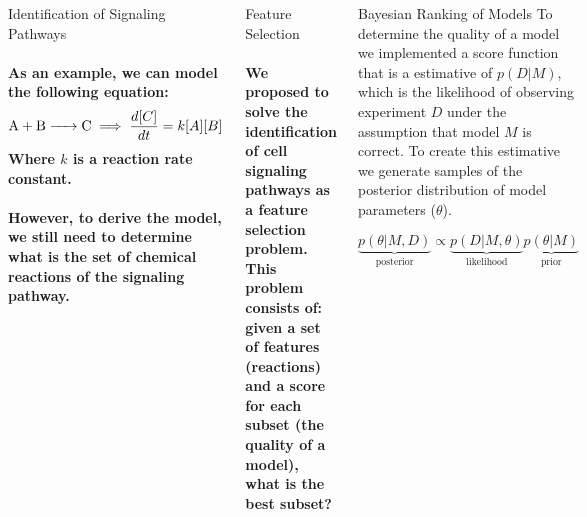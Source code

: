 \begin{frame}
\begin{columns}
{\begin{block}{Identification of Signaling Pathways}
{        
}
\paragraph{
    As an example, we can model the following equation:
    \begin{equation*}
        \ce{A + B -> C} \implies \frac{d[C]}{dt} = k[A][B]
    \end{equation*}
    Where $k$ is a reaction rate constant.
}
\paragraph{
    However, to derive the model, we still need to determine what is
    the set of chemical reactions of the signaling pathway.
}
\end{block}

\begin{block}{Feature Selection}
\paragraph{
    We proposed to solve the identification of cell signaling pathways
    as a feature selection problem. This problem consists of: given 
    a set of features (reactions) and a score for each subset (the
    \alert{quality of a model}), what is the best subset?
}
\end{block}


\begin{block}{Bayesian Ranking of Models}
    To determine the \alert{quality of a model} we implemented a 
    score function that is a estimative of $p(D | M)$, which is the 
    likelihood of observing experiment $D$ under the assumption that 
    model $M$ is correct. To create this estimative we generate 
    samples of the posterior distribution of model 
    parameters ($\theta$).
    
    \begin{equation*}
        \underbrace{p (\theta | M, D)}_{\text{posterior}} \propto 
        \underbrace{p(D | M, \theta)}_{\text{likelihood}}
        \underbrace{p(\theta|M)}_{\text{prior}}
    \end{equation*}
    
\end{block}

}
\end{columns}
\end{frame}
